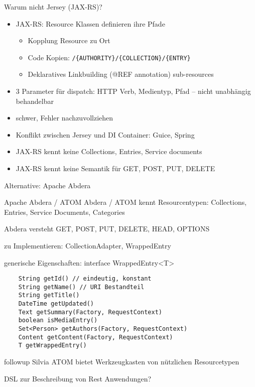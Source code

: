 \documentclass{beamer}
\begin{document}
\begin{frame}[fragile]{Warum nicht Jersey (JAX-RS)?}
\begin{itemize}
\item JAX-RS: Resource Klassen definieren ihre Pfade
  \begin{itemize}
  \item Kopplung Resource zu Ort
  \item Code Kopien: \verb:/{AUTHORITY}/{COLLECTION}/{ENTRY}:
  \item Deklaratives Linkbuilding (@REF annotation) \lightning sub-resources
  \end{itemize}
\item 3 Parameter für dispatch: HTTP Verb, Medientyp, Pfad -- nicht unabhängig behandelbar
\item schwer, Fehler nachzuvollziehen
\item Konflikt zwischen Jersey und DI Container: Guice, Spring
\item JAX-RS kennt keine Collections, Entries, Service documents
\item JAX-RS kennt keine Semantik für GET, POST, PUT, DELETE
\end{itemize}
Alternative: Apache Abdera
\end{frame}

\begin{frame}{Apache Abdera / ATOM}
  Abdera / ATOM kennt Resourcentypen: Collections, Entries, Service Documents, Categories

  Abdera versteht GET, POST, PUT, DELETE, HEAD, OPTIONS

  zu Implementieren: CollectionAdapter, WrappedEntry
\end{frame}

\begin{frame}[fragile]{generische Eigenschaften: interface WrappedEntry<T>}
  \begin{lstlisting}
    String getId() // eindeutig, konstant
    String getName() // URI Bestandteil
    String getTitle()
    DateTime getUpdated()
    Text getSummary(Factory, RequestContext)
    boolean isMediaEntry()
    Set<Person> getAuthors(Factory, RequestContext)
    Content getContent(Factory, RequestContext)
    T getWrappedEntry()
  \end{lstlisting}
\end{frame}

\begin{frame}{followup Silvia}
  ATOM bietet Werkzeugkasten von nützlichen Resourcetypen  

  DSL zur Beschreibung von Rest Anwendungen?
\end{frame}
\end{document}
